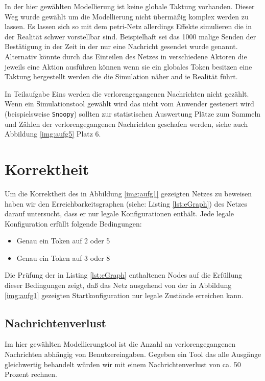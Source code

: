 \documentclass[10pt]{scrartcl}
\begin{document}
In der hier gewählten Modellierung ist keine globale Taktung vorhanden. Dieser Weg wurde gewählt um die Modellierung nicht übermäßig komplex werden zu lassen. Es lassen sich so mit dem petri-Netz allerdings Effekte simulieren die in der Realität schwer vorstellbar sind. Beispielhaft sei das 1000 malige Senden der Bestätigung in der Zeit in der nur eine Nachricht gesendet wurde genannt.   
Alternativ könnte durch das Einteilen des Netzes in verschiedene Aktoren die jeweils eine Aktion ausführen können wenn sie ein globales Token besitzen eine Taktung hergestellt werden die die Simulation näher and ie Realität führt. 

In Teilaufgabe Eins werden die verlorengegangenen Nachrichten nicht gezählt. Wenn ein Simulationstool gewählt wird das nicht vom Anwender gesteuert wird (beispielsweise \verb!Snoopy!) sollten zur statistischen Auswertung Plätze zum Sammeln und Zählen der verlorengegangenen Nachrichten geschafen werden, siehe auch Abbildung \ref{img:aufg5} Platz 6. 
	
\section{Korrektheit}
Um die Korrektheit des in Abbildung \ref{img:aufg1} gezeigten Netzes zu beweisen haben wir den Erreichbarkeitsgraphen (siehe: Listing \ref{lst:eGraph}) des Netzes darauf untersucht, dass er nur legale Konfigurationen enthält.
Jede legale Konfiguration erfüllt folgende Bedingungen:
\begin{itemize}
	\item Genau ein Token auf 2 oder 5
	\item Genau ein Token auf 3 oder 8
\end{itemize}

Die Prüfung der in Listing \ref{lst:eGraph} enthaltenen Nodes auf die Erfüllung dieser Bedingungen zeigt, daß das Netz ausgehend von der in Abbildung \ref{img:aufg1} gezeigten Startkonfiguration nur legale Zustände erreichen kann.



\subsection{Nachrichtenverlust}
Im hier gewählten Modellierungtool ist die Anzahl an verlorengegangenen Nachrichten abhängig von Benutzereingaben. Gegeben ein Tool das alle Ausgänge gleichwertig behandelt würden wir mit einem Nachrichtenverlust von ca. 50 Prozent rechnen.
\end{document}
